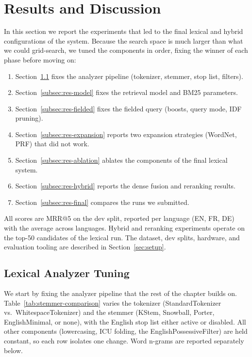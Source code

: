 \section{Results and Discussion}
\label{sec:results}

In this section we report the experiments that led to the final lexical and hybrid configurations of the system. Because the search space is much larger than what we could grid-search, we tuned the components in order, fixing the winner of each phase before moving on:

\begin{enumerate}
    \item Section~\ref{subsec:res-analyzer} fixes the analyzer pipeline (tokenizer, stemmer, stop list, filters).
    \item Section~\ref{subsec:res-model} fixes the retrieval model and BM25 parameters.
    \item Section~\ref{subsec:res-fielded} fixes the fielded query (boosts, query mode, IDF pruning).
    \item Section~\ref{subsec:res-expansion} reports two expansion strategies (WordNet, PRF) that did not work.
    \item Section~\ref{subsec:res-ablation} ablates the components of the final lexical system.
    \item Section~\ref{subsec:res-hybrid} reports the dense fusion and reranking results.
    \item Section~\ref{subsec:res-final} compares the runs we submitted.
\end{enumerate}

All scores are MRR@5 on the dev split, reported per language (EN, FR, DE) with the average across languages. Hybrid and reranking experiments operate on the top-50 candidates of the lexical run. The dataset, dev splits, hardware, and evaluation tooling are described in Section~\ref{sec:setup}.

\subsection{Lexical Analyzer Tuning}
\label{subsec:res-analyzer}

We start by fixing the analyzer pipeline that the rest of the chapter builds on. Table~\ref{tab:stemmer-comparison} varies the tokenizer (StandardTokenizer vs.\ WhitespaceTokenizer) and the stemmer (KStem, Snowball, Porter, EnglishMinimal, or none), with the English stop list either active or disabled. All other components (lowercasing, ICU folding, the EnglishPossessiveFilter) are held constant, so each row isolates one change. Word n-grams are reported separately below.

